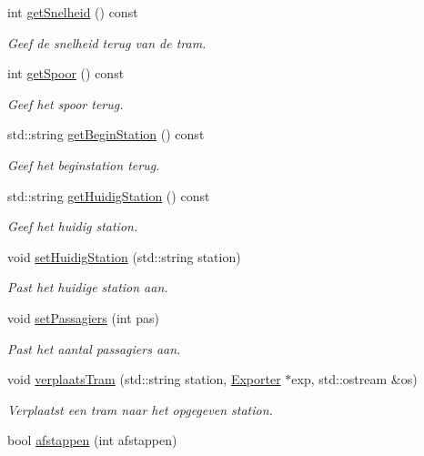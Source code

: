 \begin{DoxyCompactItemize}
int \hyperlink{class_tram_a40a12ae66cdc8965fc73d548dd038e4c}{get\+Snelheid} () const 
\begin{DoxyCompactList}\small\item\em Geef de snelheid terug van de tram. \end{DoxyCompactList}\item 
int \hyperlink{class_tram_a52655f991ffb58a8ab3557fd881a6f58}{get\+Spoor} () const 
\begin{DoxyCompactList}\small\item\em Geef het spoor terug. \end{DoxyCompactList}\item 
std\+::string \hyperlink{class_tram_aba7b84414cd60d013ac1db3f3403497d}{get\+Begin\+Station} () const 
\begin{DoxyCompactList}\small\item\em Geef het beginstation terug. \end{DoxyCompactList}\item 
std\+::string \hyperlink{class_tram_ae7bc337a42b2d839b4da5f648b781e79}{get\+Huidig\+Station} () const 
\begin{DoxyCompactList}\small\item\em Geef het huidig station. \end{DoxyCompactList}\item 
void \hyperlink{class_tram_ad8627700455e2d24563e08a72d887197}{set\+Huidig\+Station} (std\+::string station)
\begin{DoxyCompactList}\small\item\em Past het huidige station aan. \end{DoxyCompactList}\item 
void \hyperlink{class_tram_a3454b4b012930b02eff8fd22b7d9428a}{set\+Passagiers} (int pas)
\begin{DoxyCompactList}\small\item\em Past het aantal passagiers aan. \end{DoxyCompactList}\item 
void \hyperlink{class_tram_a8d55296c7ede4aa92c9b3a4b2a9495a8}{verplaats\+Tram} (std\+::string station, \hyperlink{class_exporter}{Exporter} $\ast$exp, std\+::ostream \&os)
\begin{DoxyCompactList}\small\item\em Verplaatst een tram naar het opgegeven station. \end{DoxyCompactList}\item 
bool \hyperlink{class_tram_a81186910caa5212b4a87eec84cd10a46}{afstappen} (int afstappen)

\end{DoxyCompactItemize}
